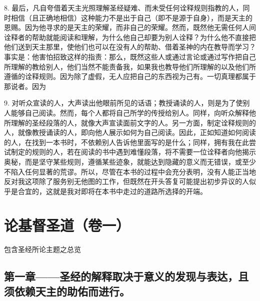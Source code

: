 8. 最后，凡自夸借着天主光照理解圣经疑难、而未受任何诠释规则指教的人，同时相信（且正确地相信）这种能力不是出于自己（即不是源于自身），而是天主的恩赐。因为他寻求的是天主的荣耀，而非自己的荣耀。然而，既然他无需任何人间诠释者的帮助就能阅读和理解，为什么他自己却要为别人诠释？为什么他不直接把他们送到天主那里，使他们也可以在没有人的帮助、借着圣神的内在教导而学习？事实是：他害怕招致这样的指责：那么，既然这些人或通过言论或通过写作把自己所理解的教给别人，他们当然不能责备我，如果我也教导他们所理解的以及他们所遵循的诠释规则。因为除了虚假，无人应把自己的东西视为己有。一切真理都属于那说者。因为\par

9. 对听众宣读的人，大声读出他眼前所见的话语；教授诵读的人，则是为了使别人能够自己阅读。然而，每个人都将自己所学的传授给别人。同样，向听众解释他所理解的圣经段落的人，就像大声宣读面前文字的人。另一方面，制定诠释规则的人，就像教授诵读的人，即向他人展示如何为自己阅读。因此，正如知道如何阅读的人，在找到一本书时，不依赖别人告诉他里面写的是什么；同样，拥有我在此尝试制定的规则的人，若在阅读的书中遇到难懂段落，将不需要一位诠释者向他揭示奥秘，而是坚守某些规则，遵循某些迹象，就能达到隐藏的意义而无错误，或至少不陷入任何显著的荒谬。所以，尽管在本书的过程中会充分表明，没有人能正当地反对我这项除了服务别无他图的工作，但既然在开头答复可能提出初步异议的人似乎是合宜的，这就是我对即将在本书中走过的道路所选择的开端。\par



\section{论基督圣道（卷一）}

包含圣经所论主题之总览\par


\subsection{第一章——圣经的解释取决于意义的发现与表达，且须依赖天主的助佑而进行。}

